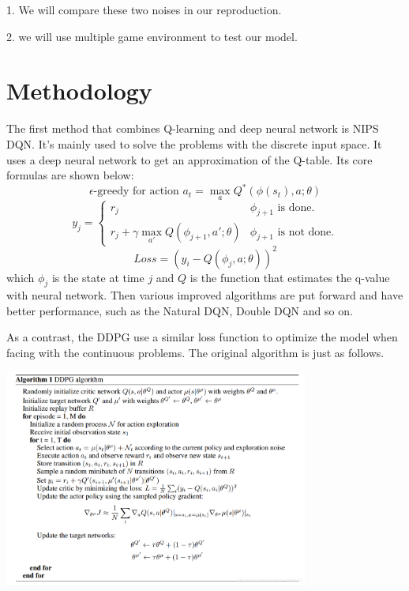\documentclass[a4paper,12pt,oneside,article]{memoir}
\begin{document}
1. We will compare these two noises in our reproduction.

2. we will use multiple game environment to test our model.

\chapter{Methodology}
The first method that combines Q-learning and deep neural network is NIPS DQN. It's mainly used to solve the problems with the discrete input space. It uses a deep neural network to get an approximation of the Q-table. Its core formulas are shown below:
\begin{equation*}
\epsilon \text{-greedy for action } a_t=\max_a Q^*(\phi(s_t), a;\theta)
\end{equation*}
\begin{equation*}
y_j=
	\begin{cases}
	r_j & \phi_{j+1} \text{ is done.}\\
	r_j+\gamma \max_{a'}Q(\phi_{j+1},a';\theta) & \phi_{j+1} \text{ is not done.}
	\end{cases}
\end{equation*}
\begin{equation*}
Loss = (y_i - Q(\phi_j,a;\theta))^2
\end{equation*}
which $\phi_j$ is the state at time $j$ and $Q$ is the function that estimates the q-value with neural network. Then various improved algorithms are put forward and have better performance, such as the Natural DQN, Double DQN and so on.

As a contrast, the DDPG use a similar loss function to optimize the model when facing with the continuous problems. The original algorithm is just as follows.

\begin{center}
\includegraphics[width=10cm]{DDPG.png}
\label{fig:smiley}
\end{center}
\end{document}

